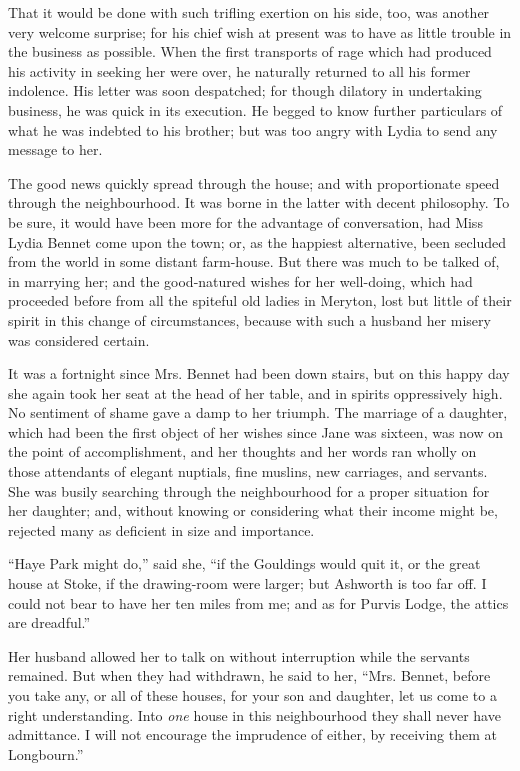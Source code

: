 \documentclass[12pt,openright]{book}
\begin{document}
That it would be done with such trifling exertion on his side, too, was another very welcome surprise; for his chief wish at present was to have as little trouble in the business as possible. When the first transports of rage which had produced his activity in seeking her were over, he naturally returned to all his former indolence. His letter was soon despatched; for though dilatory in undertaking business, he was quick in its execution. He begged to know further particulars of what he was indebted to his brother; but was too angry with Lydia to send any message to her.

The good news quickly spread through the house; and with proportionate speed through the neighbourhood. It was borne in the latter with decent philosophy. To be sure, it would have been more for the advantage of conversation, had Miss Lydia Bennet come upon the town; or, as the happiest alternative, been secluded from the world in some distant farm-house. But there was much to be talked of, in marrying her; and the good-natured wishes for her well-doing, which had proceeded before from all the spiteful old ladies in Meryton, lost but little of their spirit in this change of circumstances, because with such a husband her misery was considered certain.

It was a fortnight since Mrs. Bennet had been down stairs, but on this happy day she again took her seat at the head of her table, and in spirits oppressively high. No sentiment of shame gave a damp to her triumph. The marriage of a daughter, which had been the first object of her wishes since Jane was sixteen, was now on the point of accomplishment, and her thoughts and her words ran wholly on those attendants of elegant nuptials, fine muslins, new carriages, and servants. She was busily searching through the neighbourhood for a proper situation for her daughter; and, without knowing or considering what their income might be, rejected many as deficient in size and importance.

“Haye Park might do,” said she, “if the Gouldings would quit it, or the great house at Stoke, if the drawing-room were larger; but Ashworth is too far off. I could not bear to have her ten miles from me; and as for Purvis Lodge, the attics are dreadful.”

Her husband allowed her to talk on without interruption while the servants remained. But when they had withdrawn, he said to her, “Mrs. Bennet, before you take any, or all of these houses, for your son and daughter, let us come to a right understanding. Into \textit{one} house in this neighbourhood they shall never have admittance. I will not encourage the imprudence of either, by receiving them at Longbourn.”
\end{document}
